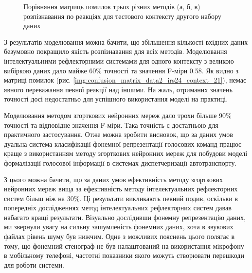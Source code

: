 \begin{figure}[ht!]
	\centering
	
	\caption{Порівняння матриць помилок трьох різних методів (а, б, в) розпізнавання по реакціях для тестового контексту другого набору даних}
	\label{img:confusion_matrix_data2_context_21}
\end{figure}

З результатів моделювання можна бачити, що збільшення кількості вхідних даних безумовно покращило якість розпізнавання для всіх методів. Моделювання інтелектуальними рефлекторними системами для одного контексту з великою вибіркою даних дало майже 60\% точності та значення F-міри 0.58. Як видно з матриці помилок (рис. \ref{img:confusion_matrix_data2_irs24_context_21}), немає явного переважання певної реакції над іншими. На жаль, отриманих значень точності досі недостатньо для успішного використання моделі на практиці.

Моделювання методом згорткових нейронних мереж дало трохи більше 90\% точності та відповідне значення F-міри. Така точність є достатньою для практичного застосування. Отже можна зробити висновок, що за даних умов дуальна система класифікації фонемної репрезентації голосових команд працює краще з використанням методу згорткових нейронних мереж для побудови моделі формалізації голосової інформації в системах диспетчеризації автотранспорту.

З цього можна бачити, що за даних умов ефективність методу згорткових нейронних мереж вища за ефективність методу інтелектуальних рефлекторних систем більш ніж на 30\%. Ці результати викликають певний подив, оскільки в попередніх дослідженнях \cite{Egorchenkov_2016,Teslia_2014,Teslia_2013} метод інтелектуальних рефлекторних систем давав набагато кращі результати. Візуально дослідивши фонемну репрезентацію даних, ми звернули увагу на сильну зашумленість фонемних даних, хоча в звукових файлах рівень шуму був нижчим. Одне з можливих пояснень цього полягає в тому, що фонемний стенограф не був налаштований на використання мікрофону в мобільному телефоні, частотні показники якого можуть створювати перешкоди для роботи системи.

